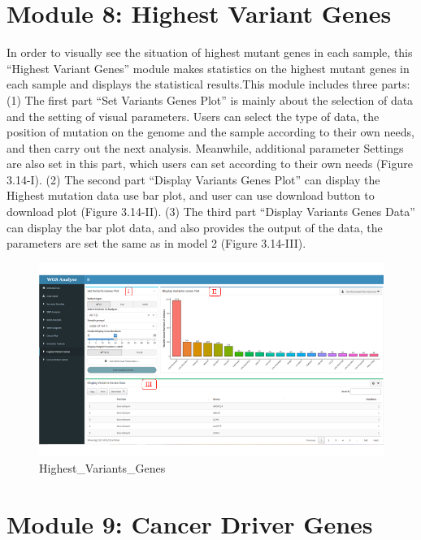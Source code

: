 \documentclass[
]{book}
\theoremstyle{definition}
\theoremstyle{definition}
\theoremstyle{definition}
\theoremstyle{definition}
\theoremstyle{remark}
\begin{document}
\hypertarget{module-8-highest-variant-genes}{%
\section{Module 8: Highest Variant Genes}\label{module-8-highest-variant-genes}}

In order to visually see the situation of highest mutant genes in each sample, this ``Highest Variant Genes'' module makes statistics on the highest mutant genes in each sample and displays the statistical results.This module includes three parts: (1) The first part ``Set Variants Genes Plot'' is mainly about the selection of data and the setting of visual parameters. Users can select the type of data, the position of mutation on the genome and the sample according to their own needs, and then carry out the next analysis. Meanwhile, additional parameter Settings are also set in this part, which users can set according to their own needs (Figure 3.14-I). (2) The second part ``Display Variants Genes Plot'' can display the Highest mutation data use bar plot, and user can use download button to download plot (Figure 3.14-II). (3) The third part ``Display Variants Genes Data'' can display the bar plot data, and also provides the output of the data, the parameters are set the same as in model 2 (Figure 3.14-III).

\begin{figure}
\includegraphics[width=1\linewidth]{figure/7.Highest_Variansts_genes_1} \caption{Highest_Variants_Genes}\label{fig:unnamed-chunk-19}
\end{figure}

\hypertarget{module-9-cancer-driver-genes}{%
\section{Module 9: Cancer Driver Genes}\label{module-9-cancer-driver-genes}}
\end{document}
